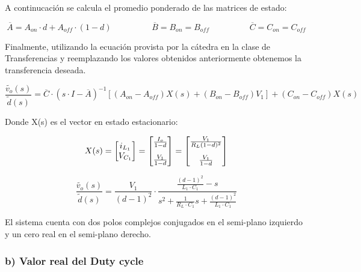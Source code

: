 \documentclass[e4_tp2_main.tex]{subfiles}
\begin{document}
A continucaci\'on se calcula el promedio ponderado de las matrices de estado:

\begin{equation}
\overline{A} = A_{on} \cdot d + A_{off} \cdot (1-d) \hspace{2cm} \overline{B}=B_{on} = B_{off}  \hspace{2cm} \overline{C}=C_{on} = C_{off}  
\end{equation}

Finalmente, utilizando la ecuaci\'on provista por la c\'atedra en la clase de Transferencias y reemplazando los valores obtenidos anteriormente obtenemos la transferencia deseada. 

\begin{equation}
\frac{ \widetilde{v_o}(s)}{\widetilde{d}(s)}= \overline{C} \cdot (s \cdot I - \overline{A})^{-1} \left[ (A_{on} - A_{off})X(s) + (B_{on} - B_{off}) V_1 \right] +(C_{on} - C_{off})X(s) 
\label{ec1.3}
\end{equation}

Donde X(s) es el vector en estado estacionario:

\begin{equation}
X(s)= 
\begin{bmatrix}
{i_{L_1}} \\
{V_{C_1}} 
\end{bmatrix}
=
\begin{bmatrix}
{\frac{I_o}{1-d}} \vspace{0.3cm} \\
{\frac{V_1}{1-d}} 
\end{bmatrix}
=
\begin{bmatrix}
{\frac{V_1}{R_L(1-d)^2}} \vspace{0.3cm} \\
{\frac{V_1}{1-d}} 
\end{bmatrix}
\end{equation}

\vspace{0.5cm}

\begin{equation}
\frac{ \widetilde{v_o}(s)}{\widetilde{d}(s)}= \frac{V_1}{(d-1)^2} \cdot
 \frac{\frac{(d-1)^2}{L_1 \cdot C_1} -s}{s^2 +\frac{1}{R_L \cdot C_1 } s + \frac{(d-1)^2}{L_1 \cdot C_1}}
\end{equation}

El sistema cuenta con dos polos complejos conjugados en el semi-plano izquierdo y un cero real en el semi-plano derecho.
\subsubsection*{b) Valor real del Duty cycle}
\end{document}
